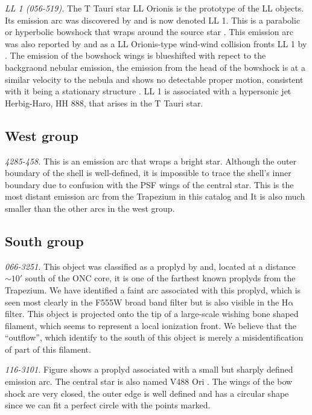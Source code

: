 \documentclass[iop, apj]{emulateapj}
\newcommand\ha{\ensuremath{\mathrm{H\alpha}}}
\begin{document}
\textit{LL 1 (056-519).} The T Tauri star LL Orionis is the prototype
of the LL objects. Its emission arc was discovered by
\citet{Gull:1979a} and is now denoted LL 1. This is a parabolic or
hyperbolic bowshock that wraps around the source star
\citep{Bally:2006a}. This emission arc was also reported by
\citet{Bally:2000a} and as a LL Orionis-type wind-wind collision
fronts LL 1 by \citet{Bally:2001a}. The emission of the bowshock wings
is blueshifted with repect to the backgraond nebular emission, the
emission from the head of the bowshock is at a similar velocity to the
nebula and shows no detectable proper motion, consistent with it being
a stationary structure \citep{Henney:2013a}. LL 1 is associated with a
hypersonic jet Herbig-Haro, HH 888, that arises in the T Tauri star.


\subsection{West group}
\label{sec:w-group}

\textit{4285-458.} This is an emission arc that wraps a bright star. Although the outer boundary of the shell is well-defined, it is impossible to trace the shell's inner boundary due to confusion with the PSF wings of the central star. This is the most distant emission arc from the Trapezium in this catalog and It is also much smaller than the other arcs in the west group.  

\subsection{South group}
\label{sec:s-group}

\textit{066-3251.} This object was classified as a proplyd by \citet{Ricci:2008a} and, located at a distance \(\sim 10'\) south of the ONC core, it is one of the farthest known proplyds from the Trapezium. We have identified a faint arc associated with this proplyd, which is seen most clearly in the F555W broad band filter but is also visible in the \ha{} filter. This object is projected onto the tip of a large-scale wishing bone shaped filament, which seems to represent a local ionization front. We believe that the ``outflow'', which \citet{Ricci:2008a} identify to the south of this object is merely a misidentification of part of this filament.  

\textit{116-3101.} Figure shows a proplyd associated with a small but sharply defined emission arc.  The central star is also named V488 Ori \citep{Bally:2006a}. The wings of the bow shock are very closed, the outer edge is well defined and has a circular shape since we can fit a perfect circle with the points marked.  
\end{document}
